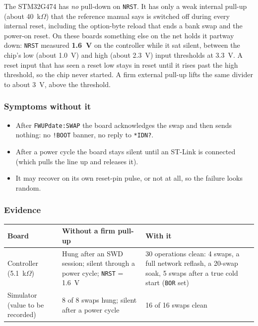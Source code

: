 \documentclass[11pt]{article}
\newcommand{\code}[1]{\texttt{#1}}
\begin{document}
The STM32G474 has \emph{no} pull-down on \code{NRST}. It has only a weak
internal pull-up (about 40~k$\Omega$) that the reference manual says is
switched off during every internal reset, including the option-byte
reload that ends a bank swap and the power-on reset. On these boards
something else on the net holds it partway down: \code{NRST} measured
\textbf{1.6~V} on the controller while it sat silent, between the chip's
low (about 1.0~V) and high (about 2.3~V) input thresholds at 3.3~V. A
reset input that has seen a reset low stays in reset until it rises past
the high threshold, so the chip never started. A firm external pull-up
lifts the same divider to about 3~V, above the threshold.

\subsubsection*{Symptoms without it}

\begin{itemize}
  \item After \code{FWUPdate:SWAP} the board acknowledges the swap and
    then sends nothing: no \code{!BOOT} banner, no reply to \code{*IDN?}.
  \item After a power cycle the board stays silent until an ST-Link is
    connected (which pulls the line up and releases it).
  \item It may recover on its own reset-pin pulse, or not at all, so the
    failure looks random.
\end{itemize}

\subsubsection*{Evidence}

\begin{center}
\begin{tabular}{p{1.4in} p{1.6in} p{1.6in}}
  \hline
  \textbf{Board} & \textbf{Without a firm pull-up} & \textbf{With it} \\
  \hline
  Controller (5.1~k$\Omega$) & Hung after an SWD session; silent through
    a power cycle; \code{NRST} = 1.6~V &
    30 operations clean: 4 swaps, a full network reflash, a 20-swap
    soak, 5 swaps after a true cold start (\code{BOR} set) \\
  Simulator (value to be recorded) & 8 of 8 swaps hung; silent after a
    power cycle & 16 of 16 swaps clean \\
  \hline
\end{tabular}
\end{center}
\end{document}
